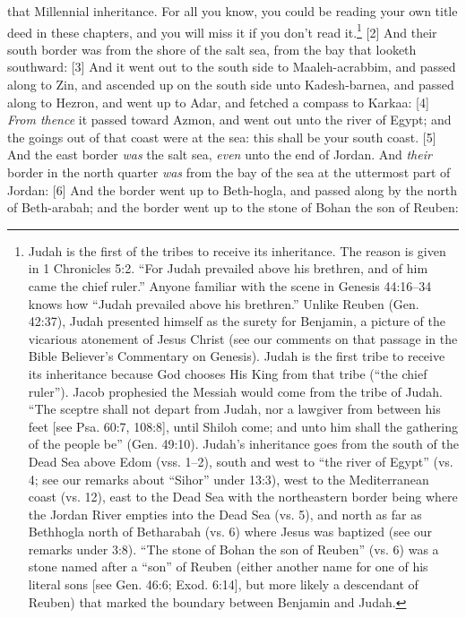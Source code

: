 {that Millennial inheritance. For all you know, you could be reading your own title deed in
these chapters, and you will miss it if you don’t read it.}\footnote{Judah is the first of the tribes to receive its
inheritance. The reason is given in 1 Chronicles
5:2.
“For Judah prevailed above his
brethren, and of him came the chief ruler.”
Anyone familiar with the scene in Genesis
44:16–34 knows how “Judah prevailed above
his brethren.” Unlike Reuben (Gen. 42:37),
Judah presented himself as the surety for
Benjamin, a picture of the vicarious atonement
of Jesus Christ (see our comments on that
passage in the Bible Believer’s Commentary on
Genesis).
Judah is the first tribe to receive its
inheritance because God chooses His King
from that tribe (“the chief ruler”). Jacob
prophesied the Messiah would come from the
tribe of Judah.
“The sceptre shall not depart from
Judah, nor a lawgiver from between his feet
[see Psa. 60:7, 108:8], until Shiloh come; and
unto him shall the gathering of the people
be” (Gen. 49:10).
Judah’s inheritance goes from the south of
the Dead Sea above Edom (vss. 1–2), south
and west to “the river of Egypt” (vs. 4; see
our remarks about “Sihor” under 13:3), west to
the Mediterranean coast (vs. 12), east to the
Dead Sea with the northeastern border being
where the Jordan River empties into the Dead
Sea (vs. 5), and north as far as Bethhogla north
of Betharabah (vs. 6) where Jesus was baptized
(see our remarks under 3:8). “The stone of
Bohan the son of Reuben” (vs. 6) was a stone
named after a “son” of Reuben (either another
name for one of his literal sons [see Gen. 46:6;
Exod. 6:14], but more likely a descendant of
Reuben) that marked the boundary between
Benjamin and Judah.}
[2] \textcolor[rgb]{0.00,0.00,1.00}{And their south border was from the shore of the salt sea, from the bay that looketh southward:}
[3] \textcolor[rgb]{0.00,0.00,1.00}{And it went out to the south side to Maaleh-acrabbim, and passed along to Zin, and ascended up on the south side unto Kadesh-barnea, and passed along to Hezron, and went up to Adar, and fetched a compass to Karkaa:}
[4] \textcolor[rgb]{0.00,0.00,1.00}{\emph{From thence} it passed toward Azmon, and went out unto the river of Egypt; and the goings out of that coast were at the sea: this shall be your south coast.}
[5] \textcolor[rgb]{0.00,0.00,1.00}{And the east border \emph{was} the salt sea, \emph{even} unto the end of Jordan. And \emph{their} border in the north quarter \emph{was} from the bay of the sea at the uttermost part of Jordan:}
[6] \textcolor[rgb]{0.00,0.00,1.00}{And the border went up to Beth-hogla, and passed along by the north of Beth-arabah; and the border went up to the stone of Bohan the son of Reuben:}
